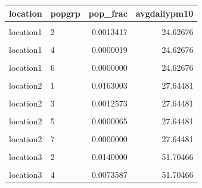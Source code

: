 \documentclass[
]{book}
\begin{document}
\begin{table}[!h]
\centering
\begin{tabular}{l|l|r|r}
\hline
location & popgrp & pop\_frac & avgdailypm10\\
\hline
\cellcolor{gray!6}{location1} & \cellcolor{gray!6}{1} & \cellcolor{gray!6}{0.0109366} & \cellcolor{gray!6}{24.62676}\\
\hline
location1 & 2 & 0.0013417 & 24.62676\\
\hline
\cellcolor{gray!6}{location1} & \cellcolor{gray!6}{3} & \cellcolor{gray!6}{0.0000686} & \cellcolor{gray!6}{24.62676}\\
\hline
location1 & 4 & 0.0000019 & 24.62676\\
\hline
\cellcolor{gray!6}{location1} & \cellcolor{gray!6}{5} & \cellcolor{gray!6}{0.0000000} & \cellcolor{gray!6}{24.62676}\\
\hline
location1 & 6 & 0.0000000 & 24.62676\\
\hline
\cellcolor{gray!6}{location1} & \cellcolor{gray!6}{7} & \cellcolor{gray!6}{0.0000000} & \cellcolor{gray!6}{24.62676}\\
\hline
location2 & 1 & 0.0163003 & 27.64481\\
\hline
\cellcolor{gray!6}{location2} & \cellcolor{gray!6}{2} & \cellcolor{gray!6}{0.0070132} & \cellcolor{gray!6}{27.64481}\\
\hline
location2 & 3 & 0.0012573 & 27.64481\\
\hline
\cellcolor{gray!6}{location2} & \cellcolor{gray!6}{4} & \cellcolor{gray!6}{0.0001202} & \cellcolor{gray!6}{27.64481}\\
\hline
location2 & 5 & 0.0000065 & 27.64481\\
\hline
\cellcolor{gray!6}{location2} & \cellcolor{gray!6}{6} & \cellcolor{gray!6}{0.0000002} & \cellcolor{gray!6}{27.64481}\\
\hline
location2 & 7 & 0.0000000 & 27.64481\\
\hline
\cellcolor{gray!6}{location3} & \cellcolor{gray!6}{1} & \cellcolor{gray!6}{0.0058760} & \cellcolor{gray!6}{51.70466}\\
\hline
location3 & 2 & 0.0140000 & 51.70466\\
\hline
\cellcolor{gray!6}{location3} & \cellcolor{gray!6}{3} & \cellcolor{gray!6}{0.0138984} & \cellcolor{gray!6}{51.70466}\\
\hline
location3 & 4 & 0.0073587 & 51.70466\\
\hline
\end{tabular}
\end{table}
\end{document}
